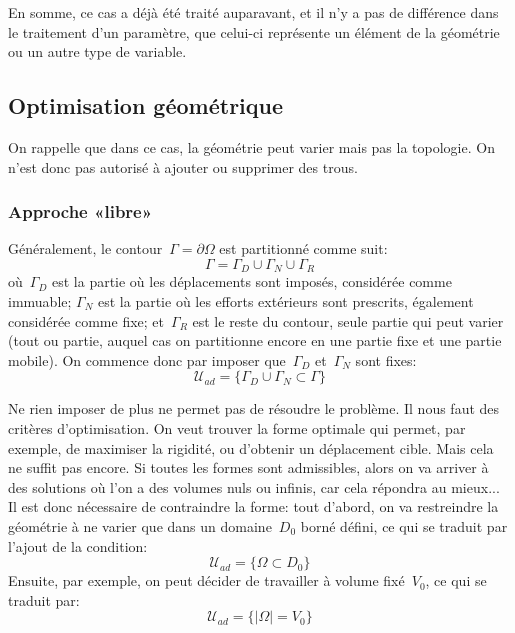 En somme, ce cas a déjà été traité auparavant, et il n'y a pas de différence dans le traitement d'un paramètre, que celui-ci représente un élément de la géométrie ou un autre type de variable.

\medskip
\subsection{Optimisation géométrique}

On rappelle que dans ce cas, la géométrie peut varier mais pas la topologie. On n'est donc pas autorisé à ajouter ou supprimer des trous.

\medskip
\subsubsection{Approche «libre»}

Généralement, le contour~$\Gamma=\partial\Omega$ est partitionné comme suit:
\begin{equation}
\Gamma = \Gamma_D \cup \Gamma_N \cup \Gamma_R
\end{equation}
où~$\Gamma_D$ est la partie où les déplacements sont imposés, considérée comme immuable; $\Gamma_N$ est la partie où les efforts extérieurs sont prescrits, également considérée comme fixe; et~$\Gamma_R$ est le reste du contour, seule partie qui peut varier (tout ou partie, auquel cas on partitionne encore en une partie fixe et une partie mobile).
On commence donc par imposer que~$\Gamma_D$ et~$\Gamma_N$ sont fixes:
\begin{equation}
\mathcal{U}_{ad}=\{ \Gamma_D \cup \Gamma_N \subset \Gamma\}
\end{equation}

Ne rien imposer de plus ne permet pas de résoudre le problème. Il nous faut des critères d'optimisation.
On veut trouver la forme optimale qui permet, par exemple, de maximiser la rigidité, ou d'obtenir un déplacement cible.
Mais cela ne suffit pas encore. Si toutes les formes sont admissibles, alors on va arriver à des solutions où l'on a des volumes nuls ou infinis, car cela répondra au mieux...
Il est donc nécessaire de contraindre la forme: 
tout d'abord, on va restreindre la géométrie à ne varier que dans un domaine~$D_0$ borné défini, ce qui se traduit par l'ajout de la condition:
\begin{equation}
\mathcal{U}_{ad}=\{ \Omega\subset D_0 \}
\end{equation}
Ensuite, par exemple, on peut décider de travailler à volume fixé~$V_0$, ce qui se traduit par:
\begin{equation}
\mathcal{U}_{ad}=\{ |\Omega|=V_0\}
\end{equation}

